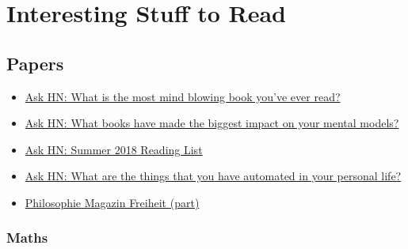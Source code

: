 \section{Interesting Stuff to Read}


\subsection{Papers}

\begin{itemize}

	\item \href{files/Ask HN_ What is the most mind blowing book you've ever read_ _ Hacker News.pdf}{Ask HN: What is the most mind blowing book you've ever read?}

	\item \href{files/Ask HN_ What books have made the biggest impact on your mental models_ _ Hacker News.pdf}{Ask HN: What books have made the biggest impact on your mental models?}

	\item \href{files/Ask HN - 2018 Summer Reading List.pdf}{Ask HN: Summer 2018 Reading List}

	\item \href{files/Ask HN - What are the things that you have automated in your personal life.pdf}{Ask HN: What are the things that you have automated in your personal life?}

	\item \href{files/PhilosophieMagazin Aug-Sep2018 - Freiheit.pdf}{Philosophie Magazin Freiheit (part)}

\end{itemize}
	
\subsubsection{Maths}

